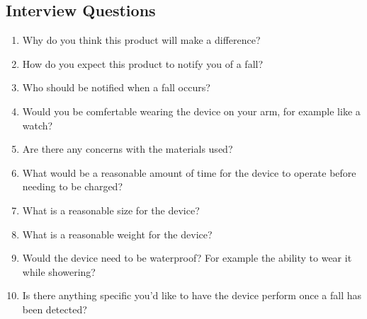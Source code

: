\documentclass[fleqn, 12pt]{article}
\begin{document}
\subsection*{Interview Questions}

\begin{enumerate}[1)]
    \item Why do you think this product will make a difference?
    \item How do you expect this product to notify you of a fall?
    \item Who should be notified when a fall occurs?
    \item Would you be comfertable wearing the device on your arm, for example like a watch?
    \item Are there any concerns with the materials used?
    \item What would be a reasonable amount of time for the device to operate before needing to be charged?
    \item What is a reasonable size for the device?
    \item What is a reasonable weight for the device?
    \item Would the device need to be waterproof? For example the ability to wear it while showering?
    \item Is there anything specific you'd like to have the device perform once a fall has been detected?
\end{enumerate}
\end{document}
